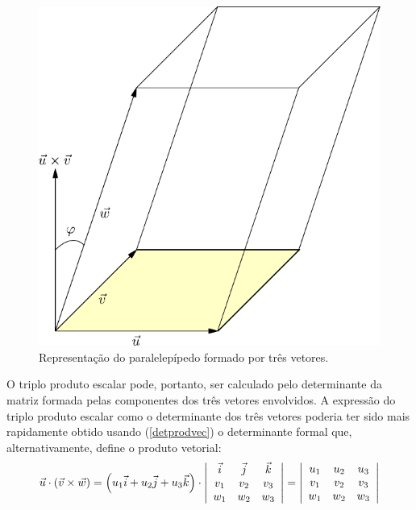 \begin{figure}%
\begin{center}
   \includegraphics{./cap_algvet/pics/volume_determinante}
   \caption{Representação do paralelepípedo formado por três vetores.}\label{fig:volume_determinante}   
  \end{center}\end{figure}
O triplo produto escalar pode, portanto, ser calculado pelo determinante da matriz formada pelas componentes dos três vetores envolvidos. A expressão do triplo produto escalar como o determinante dos três vetores poderia ter sido mais rapidamente obtido usando (\ref{detprodvec}) o determinante formal que, alternativamente, define o produto vetorial:
\begin{equation}
\vec{u}\cdot (\vec{v}\times \vec{w})
=\left(u_1\vec{i}+u_2\vec{j}+u_3\vec{k}\right)\cdot\left|\begin{array}{ccc}
\vec{i}&\vec{j}&\vec{k}\\
v_1 & v_2 & v_3\\
w_1 & w_2 & w_3\\
\end{array}
\right|=\left|\begin{array}{ccc}
	  u_1&u_2&u_3\\
	  v_1&v_2&v_3\\
	  w_1&w_2&w_3
       \end{array}
 \right|
\end{equation}



